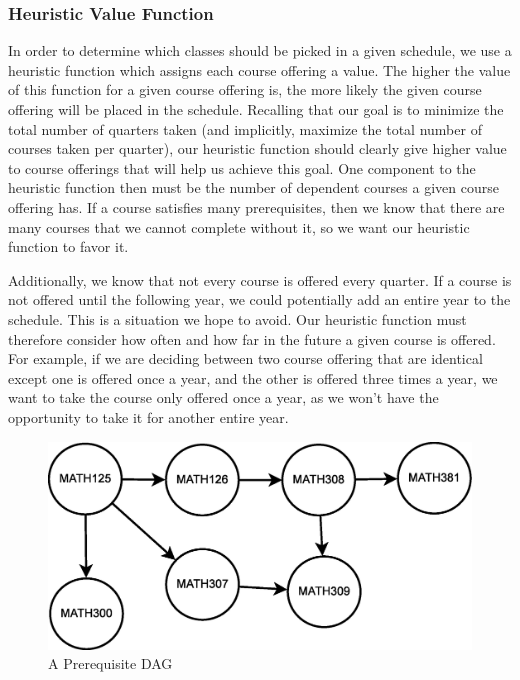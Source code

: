 \documentclass[11pt]{article} %
\begin{document}
\subsubsection{Heuristic Value Function} In order to determine which classes
should be picked in a given schedule, we use a heuristic function which assigns
each course offering a value. The higher the value of this function for a given
course offering is, the more likely the given course offering will be placed in
the schedule. Recalling that our goal is to minimize the total number of
quarters taken (and implicitly, maximize the total number of courses taken per
quarter), our heuristic function should clearly give higher value to course
offerings that will help us achieve this goal. One component to the heuristic
function then must be the number of dependent courses a given course offering
has. If a course satisfies many prerequisites, then we know that there are many
courses that we cannot complete without it, so we want our heuristic function to
favor it. 

Additionally, we know that not every course is offered every quarter. If
a course is not offered until the following year, we could potentially add an
entire year to the schedule. This is a situation we hope to avoid. Our heuristic
function must therefore consider how often and how far in the future a given
course is offered. For example, if we are deciding between two course offering
that are identical except one is offered once a year, and the other is offered
three times a year, we want to take the course only offered once a year, as we
won't have the opportunity to take it for another entire year.

\begin{figure} [ht]
    \begin{center}
        \includegraphics[scale=0.35]{more_prereq_tree}
    \end{center}
    \caption{A Prerequisite DAG}
    \label{prereq}
\end{figure}
\end{document}
